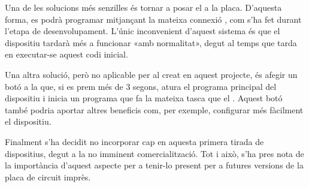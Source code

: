Una de les solucions més senzilles és tornar a posar el  a la
placa. D'aquesta forma, es podrà programar mitjançant la mateixa connexió
, com s'ha fet durant l'etapa de desenvolupament. L'únic inconvenient
d'aquest sistema és que el dispositiu tardarà més a funcionar «amb normalitat»,
degut al temps que tarda en executar-se aquest codi inicial.

Una altra solució, però no aplicable per al  creat en aquest
projecte, és afegir un botó a la  que, si es prem més de 3 segons,
atura el programa principal del dispositiu i inicia un programa que
fa la mateixa tasca que el . Aquest botó també podria aportar
altres beneficis com, per exemple, configurar més fàcilment el dispositiu.

Finalment s'ha decidit no incorporar cap  en aquesta primera
tirada de dispositius, degut a la no imminent comercialització. Tot i això, s'ha
pres nota de la importància d'aquest aspecte per a tenir-lo present per a
futures versions de la placa de circuit imprès.
